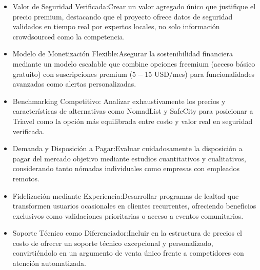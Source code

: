 \begin{itemize}
    \item Valor de Seguridad Verificada:Crear un valor agregado único que justifique el precio premium, destacando que el proyecto ofrece datos de seguridad validados en tiempo real por expertos locales, no solo información crowdsourced como la competencia.
    \item Modelo de Monetización Flexible:Asegurar la sostenibilidad financiera mediante un modelo escalable que combine opciones freemium (acceso básico gratuito) con suscripciones premium ($5-$15 USD/mes) para funcionalidades avanzadas como alertas personalizadas.
    \item Benchmarking Competitivo: Analizar exhaustivamente los precios y características de alternativas como NomadList y SafeCity para posicionar a Triavel como la opción más equilibrada entre costo y valor real en seguridad verificada.
    \item Demanda y Disposición a Pagar:Evaluar cuidadosamente la disposición a pagar del mercado objetivo mediante estudios cuantitativos y cualitativos, considerando tanto nómadas individuales como empresas con empleados remotos.
    \item Fidelización mediante Experiencia:Desarrollar programas de lealtad que transformen usuarios ocasionales en clientes recurrentes, ofreciendo beneficios exclusivos como validaciones prioritarias o acceso a eventos comunitarios.
    \item Soporte Técnico como Diferenciador:Incluir en la estructura de precios el costo de ofrecer un soporte técnico excepcional y personalizado, convirtiéndolo en un argumento de venta único frente a competidores con atención automatizada.
\end{itemize}

